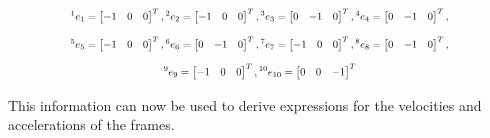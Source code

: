 \documentclass[a4paper,10pt]{article}
\newcommand\scalemath[2]{\scalebox{#1}{\mbox{\ensuremath{\displaystyle #2}}}}
\begin{document}
\[
\scalemath{0.75}{{}^1e_1 = \left[\begin{matrix}-1 & 0 & 0\end{matrix}\right]^T, 
{}^2e_2 = \left[\begin{matrix}-1 & 0 & 0\end{matrix}\right]^T, 
{}^3e_3 = \left[\begin{matrix}0 & -1 & 0\end{matrix}\right]^T, 
{}^4e_4 = \left[\begin{matrix}0 & -1 & 0\end{matrix}\right]^T,}
\]
\[
\scalemath{0.75}{{}^5e_5 = \left[\begin{matrix}-1 & 0 & 0\end{matrix}\right]^T, 
{}^6e_6 = \left[\begin{matrix}0 & -1 & 0\end{matrix}\right]^T, 
{}^7e_7 = \left[\begin{matrix}-1 & 0 & 0\end{matrix}\right]^T, 
{}^8e_8 = \left[\begin{matrix}0 & -1 & 0\end{matrix}\right]^T,}
\]
\[
\scalemath{0.75}{{}^9e_9 = \left[\begin{matrix}-1 & 0 & 0\end{matrix}\right]^T, 
{}^{10}e_{10} = \left[\begin{matrix}0 & 0 & -1\end{matrix}\right]^T}
\]

This information can now be used to derive expressions for the velocities and accelerations of the frames.
\end{document}
